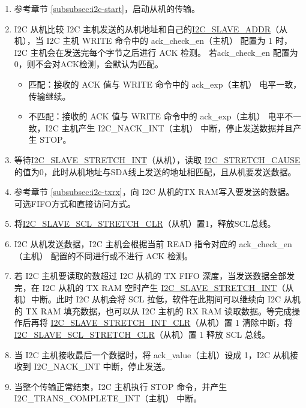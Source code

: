 \documentclass[main\_\_CN.tex]{subfiles}
\begin{document}
\begin{enumerate}
\item 参考章节 \ref{subsubsec:i2c-start}，启动从机的传输。
\item I2C 从机比较 I2C 主机发送的从机地址和自己的\hyperref[fielddesc:I2CSLAVEADDR]{I2C\_SLAVE\_ADDR}（从机），当 I2C 主机 WRITE 命令中的 ack\_check\_en（主机） 配置为 1 时，I2C 主机会在发送完每个字节之后进行 ACK 检测。 若ack\_check\_en 配置为 0，则不会对ACK检测，会默认为匹配。
\begin{itemize}
\item 匹配：接收的 ACK 值与 WRITE 命令中的 ack\_exp（主机） 电平一致，传输继续。
\item 不匹配：接收的 ACK 值与 WRITE 命令中的 ack\_exp（主机） 电平不一致，I2C 主机产生 I2C\_NACK\_INT（主机） 中断，停止发送数据并且产生 STOP。
\end{itemize}

\item 等待\hyperref[int:i2c-slave-stretch]{I2C\_SLAVE\_STRETCH\_INT}（从机），读取 \hyperref[fielddesc:I2CSTRETCHCAUSE]{I2C\_STRETCH\_CAUSE} 的值为0，此时从机地址与SDA线上发送的地址相匹配，且从机要发送数据。
\item 参考章节 \ref{subsubsec:i2c-txrx}，向 I2C 从机的TX RAM写入要发送的数据。可选FIFO方式和直接访问方式。
\item 将\hyperref[fielddesc:I2CSLAVESCLSTRETCHCLR]{I2C\_SLAVE\_SCL\_STRETCH\_CLR}（从机）置1，释放SCL总线。

\item I2C 从机发送数据，I2C 主机会根据当前 READ 指令对应的 ack\_check\_en（主机） 配置的不同进行或不进行 ACK 检测。

\item 若 I2C 主机要读取的数超过 I2C 从机的 TX FIFO 深度，当发送数据全部发完，在 I2C 从机的 TX RAM 空时产生 \hyperref[int:i2c-slave-stretch]{I2C\_SLAVE\_STRETCH\_INT}（从机）中断。此时 I2C 从机会将 SCL 拉低，软件在此期间可以继续向 I2C 从机的 TX RAM 填充数据，也可以从 I2C 主机的 RX RAM 读取数据。等完成操作后再将 \hyperref[fielddesc:I2CSLAVESTRETCHINTCLR]{I2C\_SLAVE\_STRETCH\_INT\_CLR}（从机）置 1 清除中断，将 \hyperref[fielddesc:I2CSLAVESCLSTRETCHCLR]{I2C\_SLAVE\_SCL\_STRETCH\_CLR}（从机）置 1 释放 SCL 总线。

\item 当 I2C 主机接收最后一个数据时，将 ack\_value（主机）设成 1，I2C 从机接收到 I2C\_NACK\_INT 中断，停止发送。

\item 当整个传输正常结束，I2C 主机执行 STOP 命令，并产生 I2C\_TRANS\_COMPLETE\_INT（主机） 中断。

\end{enumerate}
\end{document}
